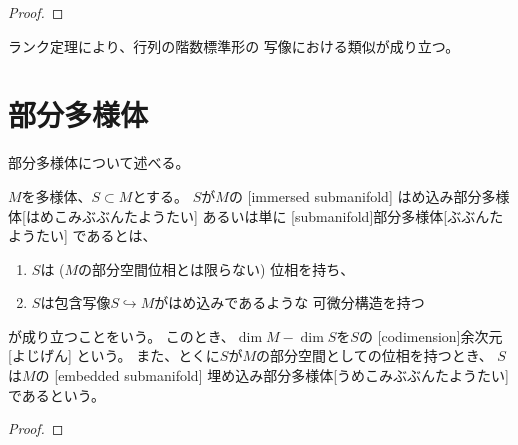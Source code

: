 \documentclass[report]{jlreq}
\begin{document}
\begin{proof}
    \TODO{}
\end{proof}

ランク定理により、行列の階数標準形の
{\smooth}写像における類似が成り立つ。

\begin{theorem}[ランク定理]
    \TODO{}
\end{theorem}



%
\section{部分多様体}

部分多様体について述べる。

\begin{definition}[部分多様体]
    $M$を多様体、$S \subset M$とする。
    $S$が$M$の
    [immersed submanifold]
        {はめ込み部分多様体}[はめこみぶぶんたようたい]
    あるいは単に
    [submanifold]{部分多様体}[ぶぶんたようたい]
    であるとは、
    \begin{enumerate}
        \item $S$は ($M$の部分空間位相とは限らない) 位相を持ち、
        \item $S$は包含写像$S \hookrightarrow M$がはめ込みであるような
            可微分構造を持つ
    \end{enumerate}
    が成り立つことをいう。
    このとき、$\dim M - \dim S$を$S$の
    [codimension]{余次元}[よじげん]
    という。
    また、とくに$S$が$M$の部分空間としての位相を持つとき、
    $S$は$M$の
    [embedded submanifold]
        {埋め込み部分多様体}[うめこみぶぶんたようたい]
    であるという。
\end{definition}

\begin{example}[開部分多様体]
    \TODO{}
\end{example}

\begin{proposition}[はめ込みの像は部分多様体]
\end{proposition}

\begin{proof}
    \TODO{}
\end{proof}
\end{document}
